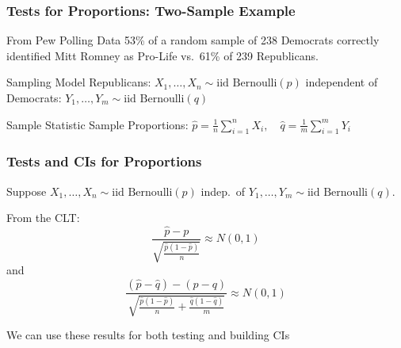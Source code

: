\documentclass[handout]{beamer}
\begin{document}
\begin{frame}
	\frametitle{Tests for Proportions: Two-Sample Example}
	\begin{block}
		{From Pew Polling Data}
		53\% of a random sample of 238 Democrats correctly identified Mitt Romney as Pro-Life vs.\ 61\% of 239 Republicans.
	\end{block}
	\begin{block}
		{Sampling Model}
		Republicans: $X_1, \hdots, X_{n} \sim \mbox{iid Bernoulli}(p)$ independent of\\
		Democrats: $Y_1, \hdots,Y_{m} \sim \mbox{iid Bernoulli}(q)$ 
	\end{block}
	\begin{block}
		{Sample Statistic}
		Sample Proportions: $\displaystyle\widehat{p} = \frac{1}{n}\sum_{i=1}^{n} X_i, \quad\displaystyle\widehat{q} = \frac{1}{m}\sum_{i=1}^{m} Y_i$
	\end{block}

	\vspace{1em}

	\hfill \alert{}
\end{frame}
\begin{frame}
\frametitle{Tests and CIs for Proportions}
\footnotesize
Suppose $X_1, \hdots, X_n \sim \mbox{iid Bernoulli}(p)$ indep.\ of $Y_1, \hdots, Y_m \sim \mbox{iid Bernoulli}(q)$.\\
\normalsize
\vspace{1em}

From the CLT:
	$$\frac{\hat{p} - p}{\sqrt{\frac{\hat{p}(1-\hat{p})}{n}}} \approx N(0,1)$$
and
$$\frac{(\hat{p} - \hat{q}) - (p-q)}{\sqrt{\frac{\hat{p}(1-\hat{p})}{n} + \frac{\hat{q}(1-\hat{q})}{m}}} \approx N(0,1)$$

\alert{We can use these results for both testing and building CIs}
\end{frame}
\end{document}
